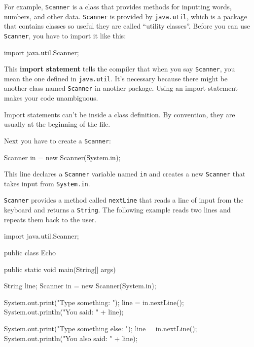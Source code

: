 \documentclass[12pt]{book}
\theoremstyle{exercise}
\newcommand{\java}[1]{\verb"#1"}
\begin{document}

For example, \java{Scanner} is a class that provides methods for inputting words, numbers, and other data.
\java{Scanner} is provided by \java{java.util}, which is a package that contains classes so useful they are called ``utility classes''.
Before you can use \java{Scanner}, you have to import it like this:

\begin{code}
import java.util.Scanner;
\end{code}


This {\bf import statement} tells the compiler that when you say \java{Scanner}, you mean the one defined in \java{java.util}.
It's necessary because there might be another class named \java{Scanner} in another package.
Using an import statement makes your code unambiguous.

Import statements can't be inside a class definition.
By convention, they are usually at the beginning of the file.

Next you have to create a \java{Scanner}:

\begin{code}
    Scanner in = new Scanner(System.in);
\end{code}

This line declares a \java{Scanner} variable named \java{in} and creates a new \java{Scanner} that takes input from \java{System.in}.

\java{Scanner} provides a method called \java{nextLine} that reads a line of input from the keyboard and returns a \java{String}.
The following example reads two lines and repeats them back to the user.

\begin{code}
import java.util.Scanner;

public class Echo {

    public static void main(String[] args) {
        String line;
        Scanner in = new Scanner(System.in);

        System.out.print("Type something: ");
        line = in.nextLine();
        System.out.println("You said: " + line);

        System.out.print("Type something else: ");
        line = in.nextLine();
        System.out.println("You also said: " + line);
    }
}
\end{code}
\end{document}
